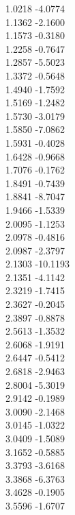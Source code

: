 {            1.0218	-4.0774\\
            1.1362	-2.1600\\
            1.1573	-0.3180\\
            1.2258	-0.7647\\
            1.2857	-5.5023\\
            1.3372	-0.5648\\
            1.4940	-1.7592\\
            1.5169	-1.2482\\
            1.5730	-3.0179\\
            1.5850	-7.0862\\
            1.5931	-0.4028\\
            1.6428	-0.9668\\
            1.7076	-0.1762\\
            1.8491	-0.7439\\
            1.8841	-8.7047\\
            1.9466	-1.5339\\
            2.0095	-1.1253\\
            2.0978	-0.4816\\
            2.0987	-2.3797\\
            2.1303	-10.1193\\
            2.1351	-4.1142\\
            2.3219	-1.7415\\
            2.3627	-0.2045\\
            2.3897	-0.8878\\
            2.5613	-1.3532\\
            2.6068	-1.9191\\
            2.6447	-0.5412\\
            2.6818	-2.9463\\
            2.8004	-5.3019\\
            2.9142	-0.1989\\
            3.0090	-2.1468\\
            3.0145	-1.0322\\
            3.0409	-1.5089\\
            3.1652	-0.5885\\
            3.3793	-3.6168\\
            3.3868	-6.3763\\
            3.4628	-0.1905\\
            3.5596	-1.6707\\
}

